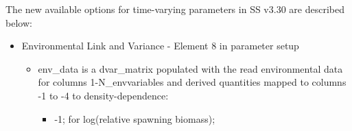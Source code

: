 The new available options for time-varying parameters in SS v3.30 are described below:
\begin{itemize}
	\item Environmental Link and  Variance - Element 8 in parameter setup
		\begin{itemize}
			\item env\_data is a dvar\_matrix populated with the read environmental data for columns 1-N\_envvariables and derived quantities mapped to columns -1 to -4 to density-dependence:
			\begin{itemize}
				\item -1;  for log(relative spawning biomass);

\end{itemize}
\end{itemize}
\end{itemize}
